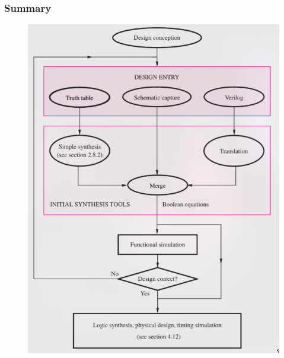 \documentclass{article}
\begin{document}
      \subsubsection{Summary}
\begin{figure}[ht!]
            \centering
            \includegraphics[scale=0.6]{flowchart.png}
            \label{stemplot}
          \end{figure} 

\setlength{\parindent}{0pt}
\titleformat{\section}{\large\bfseries}{\thesection}{1em}{}
\titleformat{\subsection}{\bfseries}{\thesubsection}{1em}{}
\maketitle
\end{document}
